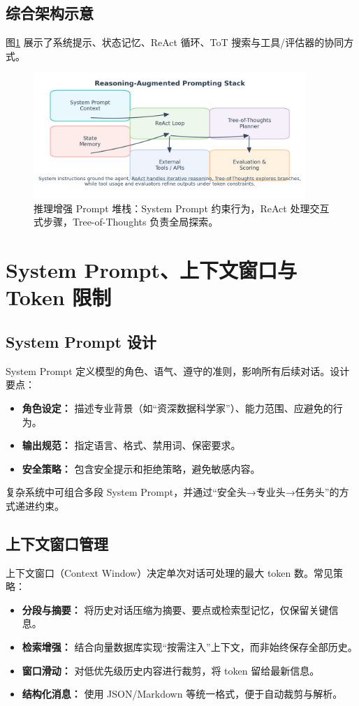 \documentclass[UTF8,zihao=-4]{ctexart}
\begin{document}
\subsection{综合架构示意}
图\ref{fig:reasoning_stack_cn} 展示了系统提示、状态记忆、ReAct 循环、ToT 搜索与工具/评估器的协同方式。
\begin{figure}[H]
  \centering
  \includegraphics[width=0.92\textwidth]{reasoning_stacks.png}
  \caption{推理增强 Prompt 堆栈：System Prompt 约束行为，ReAct 处理交互式步骤，Tree-of-Thoughts 负责全局探索。}
  \label{fig:reasoning_stack_cn}
\end{figure}

\section{System Prompt、上下文窗口与 Token 限制}
\subsection{System Prompt 设计}
System Prompt 定义模型的角色、语气、遵守的准则，影响所有后续对话。设计要点：
\begin{itemize}
  \item \textbf{角色设定：} 描述专业背景（如“资深数据科学家”）、能力范围、应避免的行为。
  \item \textbf{输出规范：} 指定语言、格式、禁用词、保密要求。
  \item \textbf{安全策略：} 包含安全提示和拒绝策略，避免敏感内容。
\end{itemize}
复杂系统中可组合多段 System Prompt，并通过“安全头→专业头→任务头”的方式递进约束。

\subsection{上下文窗口管理}
上下文窗口（Context Window）决定单次对话可处理的最大 token 数。常见策略：
\begin{itemize}
  \item \textbf{分段与摘要：} 将历史对话压缩为摘要、要点或检索型记忆，仅保留关键信息。
  \item \textbf{检索增强：} 结合向量数据库实现“按需注入”上下文，而非始终保存全部历史。
  \item \textbf{窗口滑动：} 对低优先级历史内容进行裁剪，将 token 留给最新信息。
  \item \textbf{结构化消息：} 使用 JSON/Markdown 等统一格式，便于自动裁剪与解析。
\end{itemize}
\end{document}
